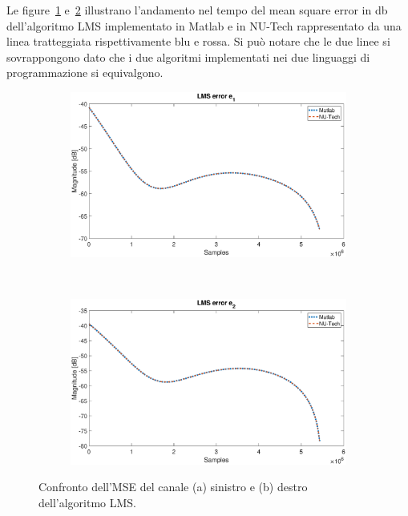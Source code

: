 \documentclass[12pt,a4paper,titlepage]{article}
\begin{document}
Le figure~\ref{fig:mse_e1_matlab_nutech} e~\ref{fig:mse_e2_matlab_nutech} illustrano l'andamento nel tempo del mean square error in \si{\decibel} dell'algoritmo LMS implementato in Matlab e in NU-Tech rappresentato da una linea tratteggiata rispettivamente blu e rossa. Si può notare che le due linee si sovrappongono dato che i due algoritmi implementati nei due linguaggi di programmazione si equivalgono.
\begin{figure}[h]
	\centering
	\begin{subfigure}{1\textwidth}
		\includegraphics[width=1\textwidth]{Immagini/mse_e1_matlab_nutech}
		\caption{}
		\label{fig:mse_e1_matlab_nutech}
	\end{subfigure}\\
	\begin{subfigure}{1\textwidth}
			\includegraphics[width=1\textwidth]{Immagini/mse_e2_matlab_nutech}
			\caption{}
			\label{fig:mse_e2_matlab_nutech}
	\end{subfigure}
	\caption{Confronto dell'MSE del canale (a) sinistro e (b) destro dell'algoritmo LMS.}
	\label{fig:mse_matlab_nutech}
\end{figure}
\end{document}
